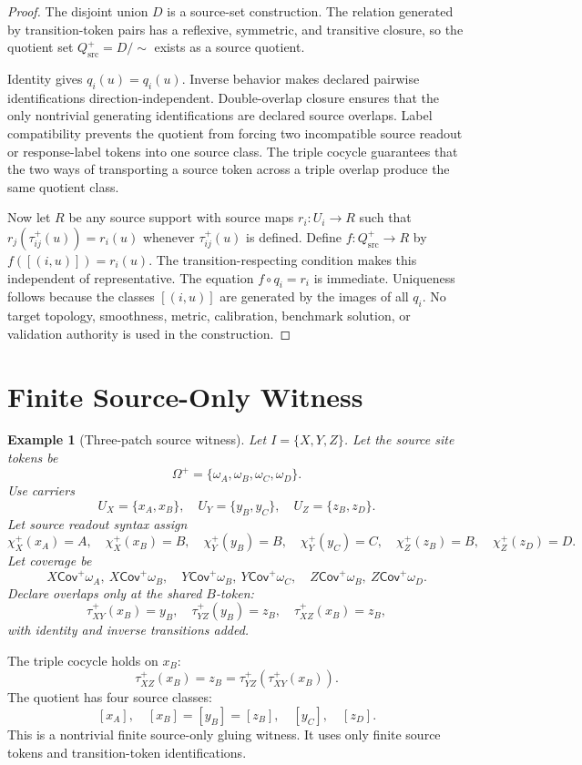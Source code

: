 \documentclass[11pt]{article}
\newcommand{\Cov}{\mathsf{Cov}^{+}}
\newcommand{\Qsrc}{Q_{\mathrm{src}}^{+}}
\newtheorem{example}{Example}
\begin{document}
\begin{proof}
The disjoint union \(D\) is a source-set construction. The relation generated
by transition-token pairs has a reflexive, symmetric, and transitive closure,
so the quotient set \(\Qsrc=D/{\sim}\) exists as a source quotient.

Identity gives \(q_i(u)=q_i(u)\). Inverse behavior makes declared pairwise
identifications direction-independent. Double-overlap closure ensures that
the only nontrivial generating identifications are declared source overlaps.
Label compatibility prevents the quotient from forcing two incompatible
source readout or response-label tokens into one source class. The triple
cocycle guarantees that the two ways of transporting a source token across a
triple overlap produce the same quotient class.

Now let \(R\) be any source support with source maps \(r_i:U_i\to R\) such
that \(r_j(\tau_{ij}^+(u))=r_i(u)\) whenever \(\tau_{ij}^+(u)\) is defined.
Define \(f:\Qsrc\to R\) by \(f([(i,u)])=r_i(u)\). The transition-respecting
condition makes this independent of representative. The equation
\(f\circ q_i=r_i\) is immediate. Uniqueness follows because the classes
\([(i,u)]\) are generated by the images of all \(q_i\). No target topology,
smoothness, metric, calibration, benchmark solution, or validation authority
is used in the construction.
\end{proof}

\section{Finite Source-Only Witness}

\begin{example}[Three-patch source witness]
Let \(I=\{X,Y,Z\}\). Let the source site tokens be
\[
  \Omega^+=\{\omega_A,\omega_B,\omega_C,\omega_D\}.
\]
Use carriers
\[
  U_X=\{x_A,x_B\},\quad
  U_Y=\{y_B,y_C\},\quad
  U_Z=\{z_B,z_D\}.
\]
Let source readout syntax assign
\[
  \chi_X^+(x_A)=A,\quad \chi_X^+(x_B)=B,\quad
  \chi_Y^+(y_B)=B,\quad \chi_Y^+(y_C)=C,\quad
  \chi_Z^+(z_B)=B,\quad \chi_Z^+(z_D)=D.
\]
Let coverage be
\[
  X\Cov\omega_A,\ X\Cov\omega_B,\quad
  Y\Cov\omega_B,\ Y\Cov\omega_C,\quad
  Z\Cov\omega_B,\ Z\Cov\omega_D.
\]
Declare overlaps only at the shared \(B\)-token:
\[
  \tau_{XY}^+(x_B)=y_B,\quad
  \tau_{YZ}^+(y_B)=z_B,\quad
  \tau_{XZ}^+(x_B)=z_B,
\]
with identity and inverse transitions added.
\end{example}

The triple cocycle holds on \(x_B\):
\[
  \tau_{XZ}^+(x_B)=z_B=\tau_{YZ}^+(\tau_{XY}^+(x_B)).
\]
The quotient has four source classes:
\[
  [x_A],\quad [x_B]=[y_B]=[z_B],\quad [y_C],\quad [z_D].
\]
This is a nontrivial finite source-only gluing witness. It uses only finite
source tokens and transition-token identifications.
\end{document}

